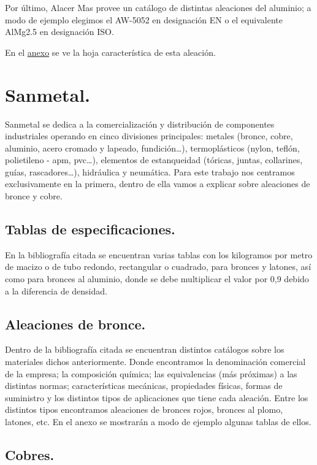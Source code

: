 \documentclass[12pt,a4paper]{article}
\begin{document}
Por último, Alacer Mas provee un catálogo de distintas aleaciones del aluminio; a modo de ejemplo elegimos el AW-5052 en designación EN o el equivalente AlMg2.5 en designación ISO.

En el \hyperref[anexo]{anexo} se ve la hoja característica de esta aleación.

\section{Sanmetal.}

Sanmetal se dedica a la comercialización y distribución de componentes industriales operando en cinco divisiones principales: metales (bronce, cobre, aluminio, acero cromado y lapeado, fundición\dots), termoplásticos (nylon, teflón, polietileno - apm, pvc\dots), elementos de estanqueidad (tóricas, juntas, collarines, guías, rascadores\dots), hidráulica y neumática. Para este trabajo nos centramos exclusivamente en la primera, dentro de ella vamos a explicar sobre aleaciones de bronce y cobre.

\subsection{Tablas de especificaciones.}

En la bibliografía citada se encuentran varias tablas con los kilogramos por metro de macizo o de tubo redondo, rectangular o cuadrado, para bronces y latones, así como para bronces al aluminio, donde se debe multiplicar el valor por 0,9 debido a la diferencia de densidad.

\subsection{Aleaciones de bronce.}

Dentro de la bibliografía citada se encuentran distintos catálogos sobre los materiales dichos anteriormente. Donde encontramos la denominación comercial de la empresa; la composición química; las equivalencias (más próximas) a las distintas normas; características mecánicas, propiedades físicas, formas de suministro y los distintos tipos de aplicaciones que tiene cada aleación. Entre los distintos tipos encontramos aleaciones de bronces rojos, bronces al plomo, latones, etc. En el anexo se mostrarán a modo de ejemplo algunas tablas de ellos.

\subsection{Cobres.}
\end{document}
